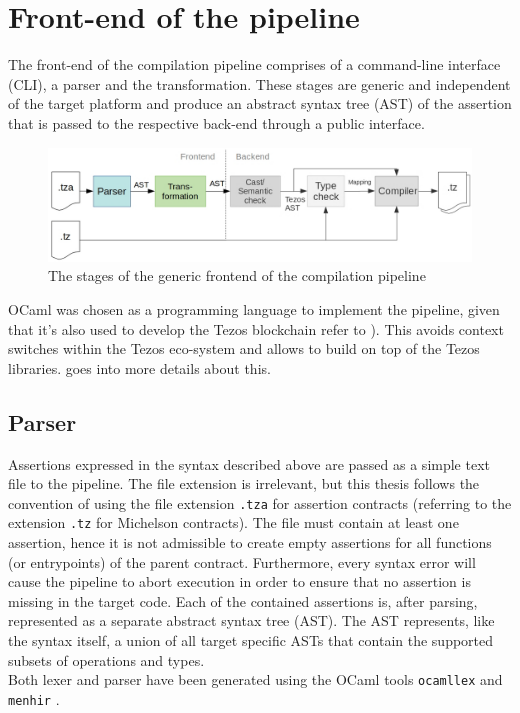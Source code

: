 \section{Front-end of the pipeline}\label{sec:pipeline_front}
The front-end of the compilation pipeline comprises of a command-line interface (CLI), a parser and the transformation. These stages are generic and independent of the target platform and produce an abstract syntax tree (AST) of the assertion that is passed to the respective back-end through a public interface.
\begin{figure}[h]
\includegraphics[width=\linewidth]{figures/3-offline/pipeline_frontend}
\caption{The stages of the generic frontend of the compilation pipeline}
\label{fig:pipeline_frontend}
\end{figure}
OCaml was chosen as a programming language to implement the pipeline, given that it's also used to develop the Tezos blockchain refer to ). This avoids context switches within the Tezos eco-system and allows to build on top of the Tezos libraries.  goes into more details about this.

\subsection{Parser}
Assertions expressed in the syntax described above are passed as a simple text file to the pipeline. The file extension is irrelevant, but this thesis follows the convention of using the file extension \texttt{.tza} for assertion contracts (referring to the extension \texttt{.tz} for Michelson contracts). The file must contain at least one assertion, hence it is not admissible to create empty assertions for all functions (or entrypoints) of the parent contract. Furthermore, every syntax error will cause the pipeline to abort execution in order to ensure that no assertion is missing in the target code. Each of the contained assertions is, after parsing, represented as a separate abstract syntax tree (AST). The AST represents, like the syntax itself, a union of all target specific ASTs that contain the supported subsets of operations and types. \\
Both lexer and parser have been generated using the OCaml tools \texttt{ocamllex} \cite{ocaml_docs} and \texttt{menhir} \cite{menhir_doc}.

